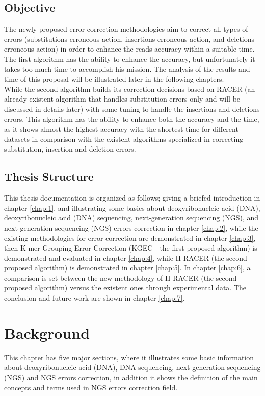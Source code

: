 \documentclass[12pt,openany]{llncs}
\begin{document}
\section{Objective}
The newly proposed error correction methodologies aim to correct all types of errors (substitutions erroneous action, insertions erroneous action, and deletions erroneous action) in order to enhance the reads accuracy within a suitable time. 
\\
The first algorithm has the ability to enhance the accuracy, but unfortunately it takes too much time to accomplish his mission. The analysis of the results and time of this proposal will be illustrated later in the following chapters. 
\\
While the second algorithm builds its correction decisions based on RACER \cite{Racer} (an already existent algorithm that handles substitution errors only and will be discussed in details later) with some tuning to handle the insertions and deletions errors. This algorithm has the ability to enhance both the accuracy and the time, as it shows almost the highest accuracy with the shortest time for different datasets in comparison with the existent algorithms specialized in correcting substitution, insertion and deletion errors.

\section{Thesis Structure}
This thesis documentation is organized as follows; giving a briefed introduction in chapter \ref{chap:1}, and illustrating some basics about deoxyribonucleic acid (DNA), deoxyribonucleic acid (DNA) sequencing, next-generation sequencing (NGS), and next-generation sequencing (NGS) errors correction in chapter \ref{chap:2}, while the  existing methodologies for error correction are demonstrated in chapter \ref{chap:3}, then K-mer Grouping Error Correction (KGEC - the first proposed algorithm) is demonstrated and evaluated in chapter \ref{chap:4}, while H-RACER (the second proposed algorithm) is demonstrated in chapter \ref{chap:5}. In chapter \ref{chap:6}, a comparison is set between the new methodology of H-RACER (the second proposed algorithm) versus the existent ones through experimental data. The conclusion and future work are shown in chapter \ref{chap:7}.
%

\newpage
\chapter{\label{chap:2}Background}
This chapter has five major sections, where it illustrates some basic information about deoxyribonucleic acid (DNA), DNA sequencing, next-generation sequencing (NGS) and NGS errors correction, in addition it shows the definition of the main concepts and terms used in NGS errors correction field.
\end{document}

